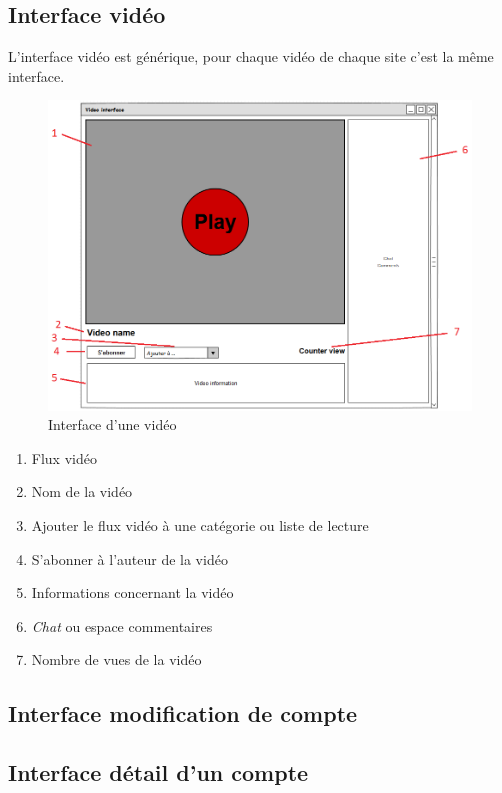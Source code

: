 \documentclass[11pt]{report} %
\begin{document}
		\newpage

		\subsection{Interface vidéo}
		L'interface vidéo est générique, pour chaque vidéo de chaque site c'est la même interface. 
		\begin{figure}[h]
			\center
			\includegraphics[width=1\textwidth]{../img/videoInterfacenum.png}
			\caption{Interface d'une vidéo}
			\label{interfacevideo}
		\end{figure}
		
		\begin{enumerate}
			\item Flux vidéo
			\item Nom de la vidéo
			\item Ajouter le flux vidéo à une catégorie ou liste de lecture
			\item S'abonner à l'auteur de la vidéo
			\item Informations concernant la vidéo
			\item \textit{Chat} ou espace commentaires
			\item Nombre de vues de la vidéo
		\end{enumerate}
		
		\subsection{Interface modification de compte}
		
		\newpage
		
		\subsection{Interface détail d'un compte}
		
\end{document}
